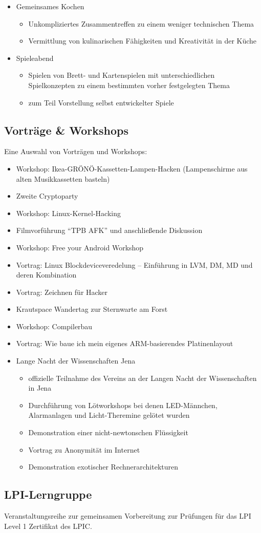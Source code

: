 \documentclass[10pt, a4paper]{scrartcl}
\begin{document}
\begin{itemize}
\begin{itemize}
		\end{itemize}
	\item Gemeinsames Kochen
		\begin{itemize}
			\item Unkompliziertes Zusammentreffen zu einem weniger technischen Thema
			\item Vermittlung von kulinarischen Fähigkeiten und Kreativität in der Küche
		\end{itemize}
	\item Spieleabend
		\begin{itemize}
			\item Spielen von Brett- und Kartenspielen mit unterschiedlichen Spielkonzepten zu einem bestimmten vorher festgelegten Thema
			\item zum Teil Vorstellung selbst entwickelter Spiele
		\end{itemize}
\end{itemize}

\subsection*{Vorträge \& Workshops}
Eine Auswahl von Vorträgen und Workshops:
\begin{itemize}
	\item Workshop: Ikea-GRÖNÖ-Kassetten-Lampen-Hacken (Lampenschirme aus alten Musikkassetten basteln)
	\item Zweite Cryptoparty
	\item Workshop: Linux-Kernel-Hacking
	\item Filmvorführung "`TPB AFK"' und anschließende Diskussion
	\item Workshop: Free your Android Workshop
	\item Vortrag: Linux Blockdeviceveredelung -- Einführung in LVM, DM, MD und deren Kombination
	\item Vortrag: Zeichnen für Hacker
	\item Krautspace Wandertag zur Sternwarte am Forst
	\item Workshop: Compilerbau
	\item Vortrag: Wie baue ich mein eigenes ARM-basierendes Platinenlayout
	\item Lange Nacht der Wissenschaften Jena
		\begin{itemize}
		    \item offizielle Teilnahme des Vereins an der Langen Nacht der Wissenschaften in Jena
		    \item Durchführung von Lötworkshops bei denen LED-Männchen, Alarmanlagen und Licht-Theremine gelötet wurden
		    \item Demonstration einer nicht-newtonschen Flüssigkeit
		    \item Vortrag zu Anonymität im Internet
		    \item Demonstration exotischer Rechnerarchitekturen
		\end{itemize}
\end{itemize}

\subsection*{LPI-Lerngruppe}
Veranstaltungsreihe zur gemeinsamen Vorbereitung zur Prüfungen für das LPI Level 1 Zertifikat des LPIC. 
\end{document}
